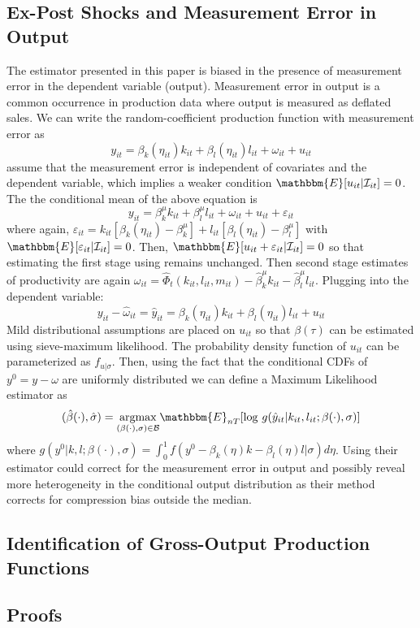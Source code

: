 \documentclass[11pt]{article}
\begin{document}
\subsection{Ex-Post Shocks and Measurement Error in Output}
The estimator presented in this paper is biased in the presence of measurement error in the dependent variable (output). Measurement error in output is a common occurrence in production data where output is measured as deflated sales. We can write the random-coefficient production function with measurement error as
\begin{equation*} 
y_{it}=\beta_{k}(\eta_{it})k_{it}+\beta_{l}(\eta_{it})l_{it}+\omega_{it}+u_{it}
\end{equation*}
\cite{Hausman2021} assume that the measurement error is independent of covariates and the dependent variable, which implies a weaker condition $\mathbbm{E}[u_{it}|\mathcal{I}_{it}]=0$. The the conditional mean of the above equation is
\begin{equation*} 
y_{it}=\beta_{k}^{\mu}k_{it}+\beta_{l}^{\mu}l_{it}+\omega_{it}+u_{it}+\varepsilon_{it}
\end{equation*}
where again, $\varepsilon_{it}=k_{it}[\beta_{k}(\eta_{it})-\beta^{\mu}_{k}]+l_{it}[\beta_{l}(\eta_{it})-\beta^{\mu}_{l}]$ with $\mathbbm{E}[\varepsilon_{it}|\mathcal{I}_{it}]=0$. Then, $\mathbbm{E}[u_{it}+\varepsilon_{it}|\mathcal{I}_{it}]=0$ so that estimating the first stage using \cite{Ackerberg2015} remains unchanged. Then second stage estimates of productivity are again $\omega_{it}=\hat{\Phi}_{t}(k_{it}, l_{it}, m_{it})-\hat{\beta}^{\mu}_{k}k_{it}-\hat{\beta}^{\mu}_{l}l_{it}$. Plugging into the dependent variable:
\begin{equation*}
y_{it}-\hat{\omega}_{it}=\hat{y}_{it}=\beta_{k}(\eta_{it})k_{it}+\beta_{l}(\eta_{it})l_{it}+u_{it}
\end{equation*}
Mild distributional assumptions are placed on $u_{it}$ so that $\beta(\tau)$ can be estimated using sieve-maximum likelihood. The probability density function of $u_{it}$ can be parameterized as $f_{u|\sigma}$. Then, using the fact that the conditional CDFs of $y^{0}=y-\omega$ are uniformly distributed we can define a Maximum Likelihood estimator as
\begin{equation}
(\hat{\beta}(\cdot),\hat{\sigma})=\underset{(\beta(\cdot),\sigma)\in \mathcal{B}}{\operatorname{argmax}}\mathbbm{E}_{nT}[\log\,g(\hat{y}_{it}|k_{it}, l_{it}; \beta(\cdot),\sigma)]
\end{equation}
where $g(y^{0}|k, l; \beta(\cdot),\sigma)=\int_{0}^{1}f(y^{0}-\beta_{k}(\eta)k-\beta_{l}(\eta)l|\sigma)d\eta$. Using their estimator could correct for the measurement error in output and possibly reveal more heterogeneity in the conditional output distribution as their method corrects for compression bias outside the median.

\subsection{Identification of Gross-Output Production Functions}

\subsection{Proofs}
\end{document}
